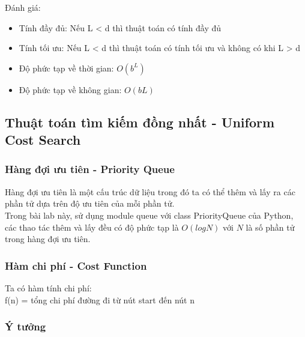 \documentclass{article}
\begin{document}
Đánh giá:\newline
\begin{itemize}
\item Tính đầy đủ: Nếu L < d thì thuật toán có tính đầy đủ
\item Tính tối ưu: Nếu L < d thì thuật toán có tính tối ưu và không có khi L > d
\item Độ phức tạp về thời gian: $O(b^L)$
\item Độ phức tạp về không gian: $O(bL)$

\end{itemize}

\subsection{Thuật toán tìm kiếm đồng nhất - Uniform Cost Search}

\subsubsection{Hàng đợi ưu tiên - Priority Queue}
Hàng đợi ưu tiên là một cấu trúc dữ liệu trong đó ta có thể thêm và lấy ra các phần tử dựa trên độ ưu tiên của mỗi phần tử. \\
Trong bài lab này, sử dụng module queue với class PriorityQueue của Python, các thao tác thêm và lấy đều có độ phức tạp là $O(logN)$ với $N$ là số phần tử trong hàng đợi ưu tiên.

\subsubsection{Hàm chi phí - Cost Function}
Ta có hàm tính chi phí:\\
f(n) = tổng chi phí đường đi từ nút start đến nút n

\subsubsection{Ý tưởng}
\end{document}
